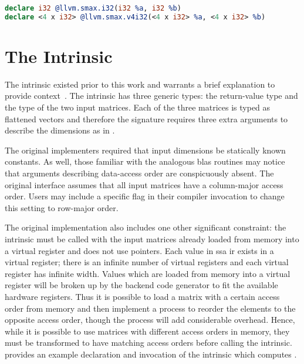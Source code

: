 \documentclass[\main/thesis.tex]{subfiles}
\begin{document}
\begin{lstlisting}[caption={[Example Inrinsic Declarations]A set of basic intrinsic declarations~\autocite{llvmLangref}.},
      label=lst:intrinsics,numbers=none,language=llvm,float,columns=flexible]
declare i32 @llvm.smax.i32(i32 %a, i32 %b)
declare <4 x i32> @llvm.smax.v4i32(<4 x i32> %a, <4 x i32> %b)
\end{lstlisting}

\section{The \texorpdfstring{}{llvm.matrix.multiply.*} Intrinsic}
\label{sec:matMulInt}
The  \gls{intrinsic} existed prior to this work and warrants a brief explanation to provide context~\autocite{llvmLangref}.
The \gls{intrinsic} has three generic types: the return-value type and the type of the two input matrices.
Each of the three matrices is typed as flattened vectors and therefore the signature requires three extra arguments to describe the dimensions as in .

The original implementers required that input dimensions be statically known constants.
As well, those familiar with the analogous \gls{blas} routines may notice that arguments describing data-access order are conspicuously absent.
The original interface assumes that all input matrices have a column-major access order.
Users may include a specific flag in their compiler invocation to change this setting to row-major order.

The original implementation also includes one other significant constraint: the intrinsic must be called with the input matrices already loaded from memory into a virtual register and does not use pointers.
Each value in  \gls{ssa} \gls{ir} exists in a virtual register; there is an infinite number of virtual registers and each virtual register has infinite width.
Values which are loaded from memory into a virtual register will be broken up by the backend code generator to fit the available hardware registers.
Thus it is possible to load a matrix with a certain access order from memory and then implement a process to reorder the elements to the opposite access order, though the process will add considerable overhead.
Hence, while it is possible to use matrices with different access orders in memory, they must be transformed to have matching access orders before calling the  \gls{intrinsic}.
 provides an example declaration and invocation of the intrinsic which computes .
\end{document}
